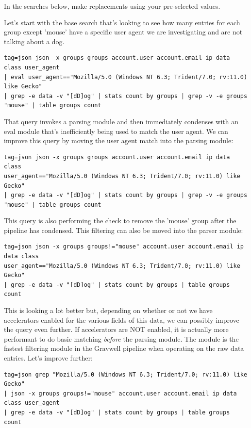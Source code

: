 In the searches below, make replacements using your pre-selected values.

Let's start with the base search that's looking to see how many entries
for each group except 'mouse' have a specific user agent we are
investigating and are not talking about a dog.

\begin{Verbatim}[breaklines=true]
tag=json json -x groups groups account.user account.email ip data class user_agent 
| eval user_agent=="Mozilla/5.0 (Windows NT 6.3; Trident/7.0; rv:11.0) like Gecko" 
| grep -e data -v "[dD]og" | stats count by groups | grep -v -e groups "mouse" | table groups count
\end{Verbatim}

That query invokes a parsing module and then immediately condenses with
an eval module that's inefficiently being used to match the user agent.
We can improve this query by moving the user agent match into the
parsing module:

\begin{Verbatim}[breaklines=true]
tag=json json -x groups groups account.user account.email ip data class 
user_agent=="Mozilla/5.0 (Windows NT 6.3; Trident/7.0; rv:11.0) like Gecko" 
| grep -e data -v "[dD]og" | stats count by groups | grep -v -e groups "mouse" | table groups count
\end{Verbatim}

This query is also performing the check to remove the 'mouse' group
after the pipeline has condensed. This filtering can also be moved into
the parser module:

\begin{Verbatim}[breaklines=true]
tag=json json -x groups groups!="mouse" account.user account.email ip data class 
user_agent=="Mozilla/5.0 (Windows NT 6.3; Trident/7.0; rv:11.0) like Gecko" 
| grep -e data -v "[dD]og" | stats count by groups | table groups count
\end{Verbatim}

This is looking a lot better but, depending on whether or not we have
accelerators enabled for the various fields of this data, we can
possibly improve the query even further. If accelerators are NOT
enabled, it is actually more performant to do basic matching \emph{before} the
parsing module. The  module is the fastest filtering module in the
Gravwell pipeline when operating on the raw data entries. Let's improve
further:

\begin{Verbatim}[breaklines=true]
tag=json grep "Mozilla/5.0 (Windows NT 6.3; Trident/7.0; rv:11.0) like Gecko" 
| json -x groups groups!="mouse" account.user account.email ip data class user_agent
| grep -e data -v "[dD]og" | stats count by groups | table groups count
\end{Verbatim}

